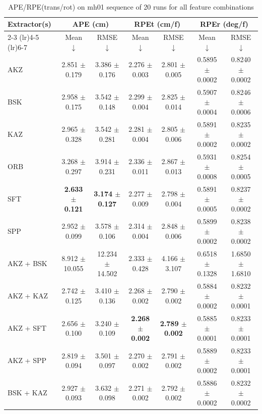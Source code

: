 \begin{table}[hbp]
\centering
\caption{APE/RPE(trans/rot) on mh01 sequence of 20 runs for all feature combinations}
\scriptsize
\label{tab:mh01_ape_rpe}\
\setlength{\tabcolsep}{3pt}
\begin{tabular}{lcccccc}
\toprule
\textbf{Extractor(s)}
& \multicolumn{2}{c}{\textbf{APE (cm)}}
& \multicolumn{2}{c}{\textbf{RPEt (cm/f)}}
& \multicolumn{2}{c}{\textbf{RPEr (deg/f)}} \\
\cmidrule(lr){2-3} \cmidrule(lr){4-5} \cmidrule(lr){6-7}
& Mean $\downarrow$ & RMSE $\downarrow$
& Mean $\downarrow$ & RMSE $\downarrow$
& Mean $\downarrow$ & RMSE $\downarrow$ \\
\midrule
AKZ & 2.851 $\pm$ 0.179 & 3.386 $\pm$ 0.176 & 2.276 $\pm$ 0.003 & 2.801 $\pm$ 0.005 & 0.5895 $\pm$ 0.0002 & 0.8240 $\pm$ 0.0002 \\
BSK & 2.958 $\pm$ 0.175 & 3.542 $\pm$ 0.148 & 2.299 $\pm$ 0.004 & 2.825 $\pm$ 0.014 & 0.5907 $\pm$ 0.0004 & 0.8246 $\pm$ 0.0006 \\
KAZ & 2.965 $\pm$ 0.328 & 3.542 $\pm$ 0.281 & 2.281 $\pm$ 0.004 & 2.805 $\pm$ 0.006 & 0.5891 $\pm$ 0.0002 & 0.8235 $\pm$ 0.0002 \\
ORB & 3.268 $\pm$ 0.297 & 3.914 $\pm$ 0.231 & 2.336 $\pm$ 0.011 & 2.867 $\pm$ 0.013 & 0.5931 $\pm$ 0.0008 & 0.8254 $\pm$ 0.0005 \\
SFT & \textbf{2.633 $\pm$ 0.121} & \textbf{3.174 $\pm$ 0.127} & 2.277 $\pm$ 0.009 & 2.798 $\pm$ 0.004 & 0.5891 $\pm$ 0.0005 & 0.8237 $\pm$ 0.0002 \\
SPP & 2.952 $\pm$ 0.099 & 3.578 $\pm$ 0.106 & 2.314 $\pm$ 0.004 & 2.848 $\pm$ 0.006 & 0.5899 $\pm$ 0.0002 & 0.8238 $\pm$ 0.0002 \\
AKZ + BSK & 8.912 $\pm$ 10.055 & 12.234 $\pm$ 14.502 & 2.333 $\pm$ 0.428 & 4.166 $\pm$ 3.107 & 0.6518 $\pm$ 0.1328 & 1.6850 $\pm$ 1.6810 \\
AKZ + KAZ & 2.742 $\pm$ 0.125 & 3.410 $\pm$ 0.136 & 2.268 $\pm$ 0.002 & 2.790 $\pm$ 0.002 & 0.5884 $\pm$ 0.0002 & 0.8232 $\pm$ 0.0001 \\
AKZ + SFT & 2.656 $\pm$ 0.100 & 3.240 $\pm$ 0.109 & \textbf{2.268 $\pm$ 0.002} & \textbf{2.789 $\pm$ 0.002} & 0.5885 $\pm$ 0.0001 & 0.8233 $\pm$ 0.0001 \\
AKZ + SPP & 2.819 $\pm$ 0.094 & 3.501 $\pm$ 0.097 & 2.270 $\pm$ 0.002 & 2.791 $\pm$ 0.002 & 0.5889 $\pm$ 0.0002 & 0.8233 $\pm$ 0.0001 \\
BSK + KAZ & 2.927 $\pm$ 0.093 & 3.632 $\pm$ 0.098 & 2.271 $\pm$ 0.002 & 2.792 $\pm$ 0.002 & 0.5886 $\pm$ 0.0002 & 0.8232 $\pm$ 0.0002 \\

\end{tabular}
\end{table}

